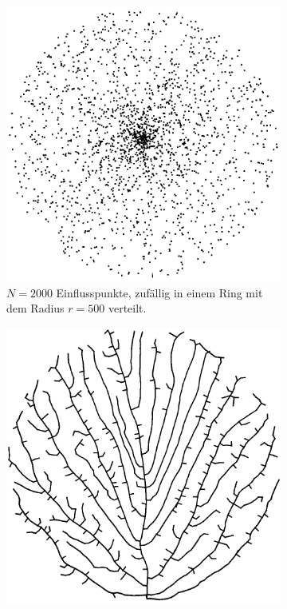 \begin{figure} [htbp]
	\centering
	\begin{subfigure}[t]{.4\textwidth}
		\centering
		\includegraphics[width=\linewidth]{images/SCA_Extended1.png}
		\caption{$N=2000$ Einflusspunkte, zufällig in einem Ring mit dem Radius $r = 500$ verteilt.}
		\label{subfig:SCA_Extended1}
	\end{subfigure}
	\hspace{.1\textwidth}
	\begin{subfigure}[t]{.4\textwidth}
		\centering
		\includegraphics[width=\linewidth]{images/SCA_Extended2.png}

\end{subfigure}
\end{figure}
